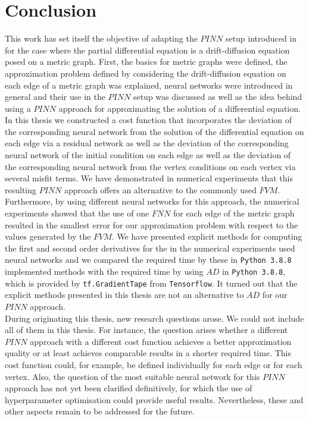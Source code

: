 \chapter{Conclusion}
\label{ch5}

This work has set itself the objective of adapting the $PINN$ setup introduced in \cite{RaissiPerdikarisKarniadakisPart1:2017} for the case where the partial differential equation is a drift-diffusion equation posed on a metric graph. First, the basics for metric graphs were defined, the approximation problem defined by considering the drift-diffusion equation on each edge of a metric graph was explained, neural networks were introduced in general and their use in the $PINN$ setup was discussed as well as the idea behind using a $PINN$ approach for approximating the solution of a differential equation. In this thesis we constructed a cost function that incorporates the deviation of the corresponding neural network from the solution of the differential equation on each edge via a residual network as well as the deviation of the corresponding neural network of the initial condition on each edge as well as the deviation of the corresponding neural network from the vertex conditions on each vertex via several misfit terms. We have demonstrated in numerical experiments that this resulting $PINN$ approach offers an alternative to the commonly used $FVM$. Furthermore, by using different neural networks for this approach, the numerical experiments showed that the use of one $FNN$ for each edge of the metric graph resulted in the smallest error for our approximation problem with respect to the values generated by the $FVM$. We have presented explicit methods for computing the first and second order derivatives for the in the numerical experiments used neural networks and we compared the required time by these in \lstinline!Python 3.8.8! implemented methods with the required time by using $AD$ in \lstinline!Python 3.8.8!, which is provided by \lstinline!tf.GradientTape! from \lstinline!Tensorflow!. It turned out that the explicit methods presented in this thesis are not an alternative to $AD$ for our $PINN$ approach. \\
During originating this thesis, new research questions arose. We could not include all of them in this thesis. For instance, the question arises whether a different $PINN$ approach with a different cost function achieves a better approximation quality or at least achieves comparable results in a shorter required time. This cost function could, for example, be defined individually for each edge or for each vertex. Also, the question of the most suitable neural network for this $PINN$ approach has not yet been clarified definitively, for which the use of hyperparameter optimisation could provide useful results. Nevertheless, these and other aspects remain to be addressed for the future.  \\


